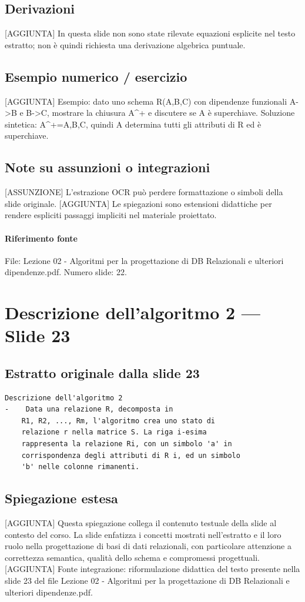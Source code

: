 \documentclass[11pt]{article}
\begin{document}
\subsection*{Derivazioni}
[AGGIUNTA] In questa slide non sono state rilevate equazioni esplicite nel testo estratto; non è quindi richiesta una derivazione algebrica puntuale.
\subsection*{Esempio numerico / esercizio}
[AGGIUNTA] Esempio: dato uno schema R(A,B,C) con dipendenze funzionali A->B e B->C, mostrare la chiusura A^+ e discutere se A è superchiave. Soluzione sintetica: A^+={A,B,C}, quindi A determina tutti gli attributi di R ed è superchiave.
\subsection*{Note su assunzioni o integrazioni}
[ASSUNZIONE] L'estrazione OCR può perdere formattazione o simboli della slide originale.
[AGGIUNTA] Le spiegazioni sono estensioni didattiche per rendere espliciti passaggi impliciti nel materiale proiettato.
\paragraph{Riferimento fonte} File: Lezione 02 - Algoritmi per la progettazione di DB Relazionali e ulteriori dipendenze.pdf. Numero slide: 22.
\section{Descrizione dell'algoritmo 2 --- Slide 23}
\subsection*{Estratto originale dalla slide 23}
\begin{lstlisting}
Descrizione dell'algoritmo 2
-    Data una relazione R, decomposta in
    R1, R2, ..., Rm, l'algoritmo crea uno stato di
    relazione r nella matrice S. La riga i-esima
    rappresenta la relazione Ri, con un simbolo 'a' in
    corrispondenza degli attributi di R i, ed un simbolo
    'b' nelle colonne rimanenti.
\end{lstlisting}
\subsection*{Spiegazione estesa}
[AGGIUNTA] Questa spiegazione collega il contenuto testuale della slide al contesto del corso. La slide enfatizza i concetti mostrati nell'estratto e il loro ruolo nella progettazione di basi di dati relazionali, con particolare attenzione a correttezza semantica, qualità dello schema e compromessi progettuali.
[AGGIUNTA] Fonte integrazione: riformulazione didattica del testo presente nella slide 23 del file Lezione 02 - Algoritmi per la progettazione di DB Relazionali e ulteriori dipendenze.pdf.
\end{document}
